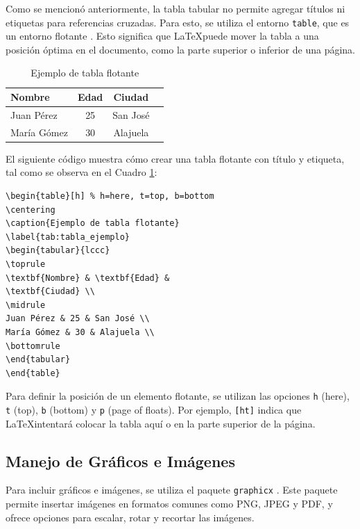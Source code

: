Como se mencionó anteriormente, la tabla tabular no permite agregar títulos ni etiquetas para referencias cruzadas. Para esto, se utiliza el entorno \texttt{table}, que es un entorno flotante \cite{latex_project}. Esto significa que \LaTeX puede mover la tabla a una posición óptima en el documento, como la parte superior o inferior de una página.

\begin{table}[h]
\centering
\caption{Ejemplo de tabla flotante}
\label{tab:tabla_ejemplo}
\begin{tabular}{lccc}
\toprule
\textbf{Nombre} & \textbf{Edad} & \textbf{Ciudad} \\
\midrule
Juan Pérez & 25 & San José \\
María Gómez & 30 & Alajuela \\
\bottomrule
\end{tabular}
\end{table}

El siguiente código muestra cómo crear una tabla flotante con título y etiqueta, tal como se observa en el Cuadro \ref{tab:tabla_ejemplo}:

\begin{verbatim}
\begin{table}[h] % h=here, t=top, b=bottom
\centering
\caption{Ejemplo de tabla flotante}
\label{tab:tabla_ejemplo}
\begin{tabular}{lccc}
\toprule
\textbf{Nombre} & \textbf{Edad} & 
\textbf{Ciudad} \\
\midrule
Juan Pérez & 25 & San José \\
María Gómez & 30 & Alajuela \\
\bottomrule
\end{tabular}
\end{table}
\end{verbatim}

Para definir la posición de un elemento flotante, se utilizan las opciones \texttt{h} (here), \texttt{t} (top), \texttt{b} (bottom) y \texttt{p} (page of floats). Por ejemplo, \texttt{[ht]} indica que \LaTeX intentará colocar la tabla aquí o en la parte superior de la página.

\subsection{Manejo de Gráficos e Imágenes}

Para incluir gráficos e imágenes, se utiliza el paquete \texttt{graphicx} \cite{graphicx}. Este paquete permite insertar imágenes en formatos comunes como PNG, JPEG y PDF, y ofrece opciones para escalar, rotar y recortar las imágenes.

